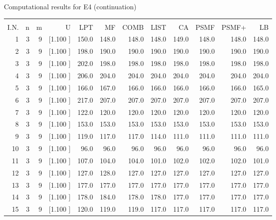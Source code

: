\documentclass[12pt,a4paper]{article}
\begin{document}
\newpage
\begin{center}
 Computational results for E4 (continuation) {\tiny
\begin{tabular}{r r r r r r r r r r r r}\hline
    &   &   &          &        &        &        &        &        &        &        &       \\[-0.1in]
  I.N.  &  n  &  m  &  U  &  LPT  &  MF  &  COMB  &  LIST  &  CA  & PSMF &PSMF+ & LB \\[0.03in]
\hline
   1&  3&  9&[1.100     ]&   150.0&   148.0&   148.0&   148.0&   149.0&   148.0&   148.0&   148.0\\[-0.02in]
   2&  3&  9&[1.100     ]&   198.0&   190.0&   190.0&   190.0&   190.0&   190.0&   190.0&   190.0\\[-0.02in]
   3&  3&  9&[1.100     ]&   202.0&   198.0&   198.0&   198.0&   198.0&   198.0&   198.0&   198.0\\[-0.02in]
   4&  3&  9&[1.100     ]&   206.0&   204.0&   204.0&   204.0&   204.0&   204.0&   204.0&   204.0\\[-0.02in]
   5&  3&  9&[1.100     ]&   166.0&   167.0&   166.0&   166.0&   166.0&   166.0&   166.0&   165.0\\[-0.02in]
   6&  3&  9&[1.100     ]&   217.0&   207.0&   207.0&   207.0&   207.0&   207.0&   207.0&   207.0\\[-0.02in]
   7&  3&  9&[1.100     ]&   122.0&   120.0&   120.0&   120.0&   120.0&   120.0&   120.0&   120.0\\[-0.02in]
   8&  3&  9&[1.100     ]&   153.0&   153.0&   153.0&   153.0&   153.0&   153.0&   153.0&   153.0\\[-0.02in]
   9&  3&  9&[1.100     ]&   119.0&   117.0&   117.0&   114.0&   111.0&   111.0&   111.0&   111.0\\[-0.02in]
  10&  3&  9&[1.100     ]&    96.0&    96.0&    96.0&    96.0&    96.0&    96.0&    96.0&    96.0\\[-0.02in]
  11&  3&  9&[1.100     ]&   107.0&   104.0&   104.0&   101.0&   102.0&   102.0&   102.0&   101.0\\[-0.02in]
  12&  3&  9&[1.100     ]&   127.0&   128.0&   127.0&   127.0&   127.0&   127.0&   127.0&   127.0\\[-0.02in]
  13&  3&  9&[1.100     ]&   177.0&   177.0&   177.0&   177.0&   177.0&   177.0&   177.0&   177.0\\[-0.02in]
  14&  3&  9&[1.100     ]&   178.0&   184.0&   178.0&   178.0&   177.0&   177.0&   177.0&   177.0\\[-0.02in]
  15&  3&  9&[1.100     ]&   120.0&   119.0&   119.0&   117.0&   117.0&   117.0&   117.0&   117.0\\[-0.02in]

\end{tabular}}
\end{center}
\end{document}
